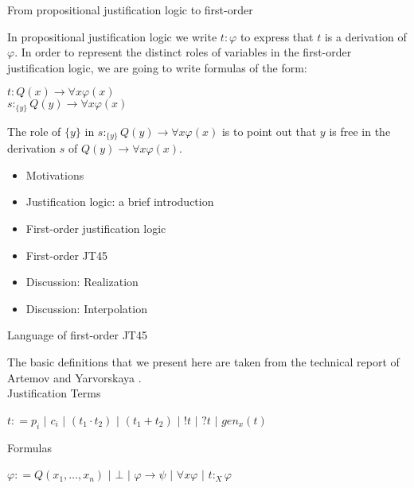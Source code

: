 \documentclass{beamer}
\theoremstyle{definition}
\newcommand{\impli}{\rightarrow}
\newcommand{\todo}{\forall}
\begin{document}
\begin{frame}{From propositional justification logic to first-order}

\qquad In propositional justification logic we write $t$$: $$\varphi$ to express that $t$ is a derivation of $\varphi$. In order to represent the distinct roles of variables in the first-order justification logic, we are going to write formulas of the form:
\begin{center}
\vspace{5 mm}
$t$$:$$Q(x) \impli \todo x\varphi(x)$\\
\vspace{5 mm}
$s$$:_{\{y\}}$$Q(y) \impli \todo x\varphi(x)$
\end{center}


\qquad The role of $\{y\}$ in $s$$:_{\{y\}}$$Q(y) \impli \todo x\varphi(x)$ is to point out that $y$ is free in the derivation $s$ of $Q(y) \impli \todo x\varphi(x)$. 
\end{frame}

\begin{frame}
	\begin{itemize}
		\item[] Motivations
		\vspace{5mm}
		\item[] Justification logic: a brief introduction
		\vspace{5mm}
		\item[] First-order justification logic
		\vspace{5mm}
		\item[] {\color{blue}First-order JT45}
		\vspace{5mm}
		\item[] Discussion: Realization
		\vspace{5mm}
		\item[] Discussion: Interpolation
	\end{itemize} 
\end{frame}



\begin{frame}{Language of first-order JT45}

\qquad The basic definitions that we present here are taken from the technical report of Artemov and Yarvorskaya \cite{Artemov11}.\\
\vspace{5mm}
Justification Terms
	\begin{center}
		$ t : = p_{i}$   $|$ $c_{i}$ $|$  $(t_{1} \cdot t_{2})$ $|$ $(t_{1} + t_{2})$ $|$  $!t$ $|$ $?t$ $|$ $gen_{x}(t)$
	\end{center}
\vspace{5mm}	
Formulas
	\begin{center}
		$ \varphi : = Q(x_1, \dots, x_n)$   $|$ $\bot$ $|$  $\varphi \impli \psi$ $|$ $\todo x \varphi$ $|$  $t$$:_{X}$$\varphi$
	\end{center}


\end{frame}
	
\end{document}
